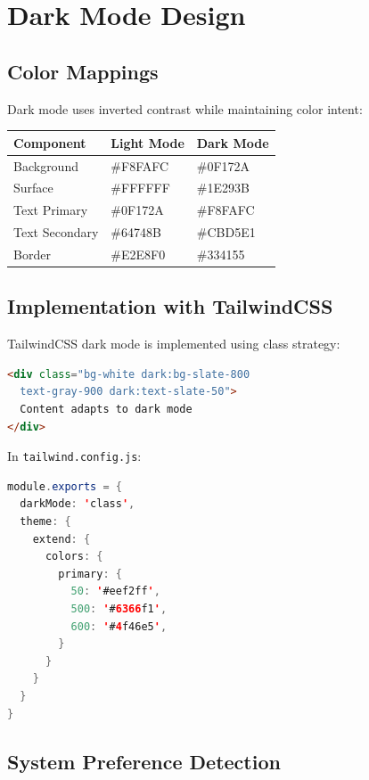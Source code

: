 \documentclass{report}
\begin{document}
\chapter{Dark Mode Design}

\section{Color Mappings}

Dark mode uses inverted contrast while maintaining color intent:

\begin{table}[h]
\centering
\begin{tabular}{|l|l|l|}
\hline
\textbf{Component} & \textbf{Light Mode} & \textbf{Dark Mode} \\
\hline
Background & \#F8FAFC & \#0F172A \\
\hline
Surface & \#FFFFFF & \#1E293B \\
\hline
Text Primary & \#0F172A & \#F8FAFC \\
\hline
Text Secondary & \#64748B & \#CBD5E1 \\
\hline
Border & \#E2E8F0 & \#334155 \\
\hline
\end{tabular}
\end{table}

\section{Implementation with TailwindCSS}

TailwindCSS dark mode is implemented using class strategy:

\begin{lstlisting}[language=HTML]
<div class="bg-white dark:bg-slate-800 
  text-gray-900 dark:text-slate-50">
  Content adapts to dark mode
</div>
\end{lstlisting}

In \texttt{tailwind.config.js}:

\begin{lstlisting}[language=Java]
module.exports = {
  darkMode: 'class',
  theme: {
    extend: {
      colors: {
        primary: {
          50: '#eef2ff',
          500: '#6366f1',
          600: '#4f46e5',
        }
      }
    }
  }
}
\end{lstlisting}

\section{System Preference Detection}
\end{document}
